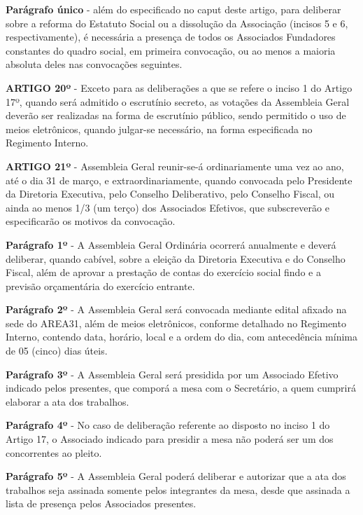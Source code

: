 \bigskip

\textbf{Parágrafo único} - além do especificado no caput deste artigo, para 
deliberar sobre a reforma do Estatuto Social ou a dissolução da Associação 
(incisos 5 e 6, respectivamente), é necessária a presença de todos os 
Associados Fundadores constantes do quadro social, em primeira convocação, 
ou ao menos a maioria absoluta deles nas convocações seguintes.

\bigskip

\textbf{ARTIGO 20º} - Exceto para as deliberações a que se refere o inciso 1 
do Artigo 17º, quando será admitido o escrutínio secreto, as votações da 
Assembleia Geral deverão ser realizadas na forma de escrutínio público, 
sendo permitido o uso de meios eletrônicos, quando julgar-se necessário, 
na forma especificada no Regimento Interno.

\bigskip

\textbf{ARTIGO 21º} - Assembleia Geral reunir-se-á ordinariamente uma vez 
ao ano, até o dia 31 de março, e extraordinariamente, quando convocada pelo 
Presidente da Diretoria Executiva, pelo Conselho Deliberativo, pelo Conselho 
Fiscal, ou ainda ao menos 1/3 (um terço) dos Associados Efetivos, que 
subscreverão e especificarão os motivos da convocação.

\bigskip

\textbf{Parágrafo 1º} - A Assembleia Geral Ordinária ocorrerá anualmente e 
deverá deliberar, quando cabível, sobre a eleição da Diretoria Executiva e 
do Conselho Fiscal, além de aprovar a prestação de contas do exercício social 
findo e a previsão orçamentária do exercício entrante.

\bigskip

\textbf{Parágrafo 2º} - A Assembleia Geral será convocada mediante edital 
afixado na sede do AREA31, além de meios eletrônicos, conforme detalhado 
no Regimento Interno, contendo data, horário, local e a ordem do dia, 
com antecedência mínima de 05 (cinco) dias úteis.

\bigskip

\textbf{Parágrafo 3º} - A Assembleia Geral será presidida por um Associado 
Efetivo indicado pelos presentes, que comporá a mesa com o Secretário, 
a quem cumprirá elaborar a ata dos trabalhos.

\bigskip

\textbf{Parágrafo 4º} - No caso de deliberação referente ao disposto no 
inciso 1 do Artigo 17, o Associado indicado para presidir a mesa não poderá 
ser um dos concorrentes ao pleito.

\bigskip

\textbf{Parágrafo 5º} - A Assembleia Geral poderá deliberar e autorizar que a 
ata dos trabalhos seja assinada somente pelos integrantes da mesa, 
desde que assinada a lista de presença pelos Associados presentes.
